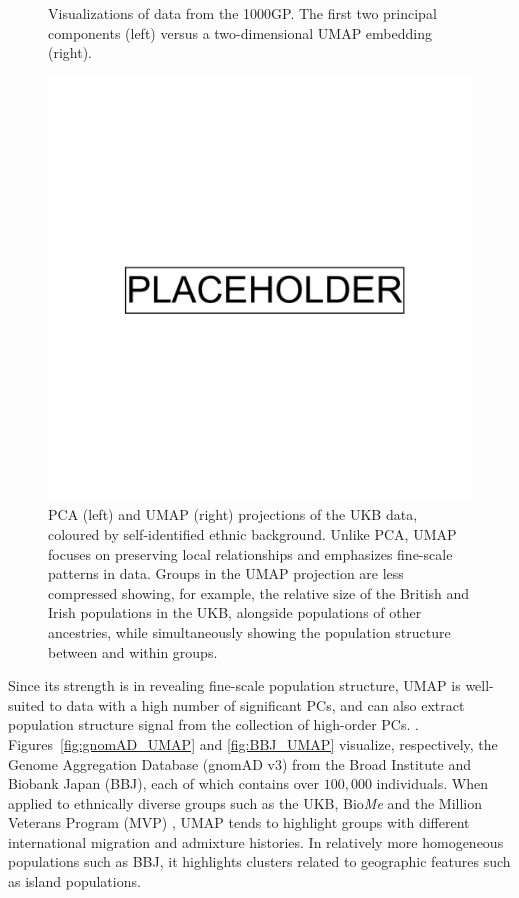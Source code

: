 \begin{figure}[h!]
\begin{subfigure}[b]{0.45\linewidth}
    \caption{}
    \label{fig:UMAP}
  \end{subfigure}
  \caption[PCA compared to UMAP of the 1KGP]{Visualizations of data from the 1000GP. The first two principal components (left) versus a two-dimensional UMAP embedding (right).}
  \label{fig:PCA_and_UMAP}
\end{figure}

\clearpage

\begin{figure}[h!]
  \centering
    \includegraphics[width=0.8\linewidth]{placeholder.png}
  \caption[PCA vs UMAP of the UKB]{PCA (left) and UMAP (right) projections of the UKB data, coloured by self-identified ethnic background. Unlike PCA, UMAP focuses on preserving local relationships and emphasizes fine-scale patterns in data. Groups in the UMAP projection are less compressed showing, for example, the relative size of the British and Irish populations in the UKB, alongside populations of other ancestries, while simultaneously showing the population structure between and within groups.}
  \label{fig:UKB}
\end{figure}

\clearpage

Since its strength is in revealing fine-scale population structure, UMAP is well-suited to data with a high number of significant PCs, and can also extract population structure signal from the collection of high-order PCs. \citep{diaz-papkovich_umap_2019}.  Figures~\ref{fig:gnomAD_UMAP} and \ref{fig:BBJ_UMAP} visualize, respectively, the Genome Aggregation Database (gnomAD v3) from the Broad Institute\citep{karczewski_mutational_2020} and Biobank Japan (BBJ)\citep{nagai2017overview}\citep{sakaue_dimensionality_2020}, each of which contains over $100,000$ individuals. When applied to ethnically diverse groups such as the UKB, Bio\textit{Me}\citep{belbin_towards_2019} and the Million Veterans Program (MVP) \citep{hunter-zinck_genotyping_2020}, UMAP tends to highlight groups with different international migration and admixture histories. In relatively more homogeneous populations such as BBJ, it highlights clusters related to geographic features such as island populations.

